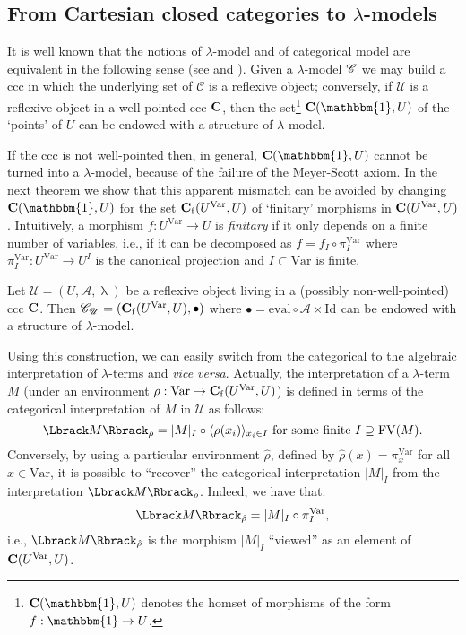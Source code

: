 \documentclass[english]{llncs}
\renewcommand{\bold}[1]{{\bf #1}}
\newcommand{\Var}{\mathrm{Var}}
\newcommand{\FV}{\mathrm{FV}}
\newcommand{\Id}[1]{\mathrm{Id}_{#1}}
\newcommand{\cat}[1]{\bold{#1}}
\newcommand{\Termobj}{\mathbbm{1}}
\newcommand{\eval}{\mathrm{eval}}
\newcommand{\proj}[1]{\pi_{#1}}
\newcommand{\Fmor}[2]{\cat{#1}_\mathrm{f}(#2^\Var,#2)}
\newcommand{\ro}[1]{\mathscr{#1}} \newcommand{\App}{\mathcal{A}}
\newcommand{\Abs}{\uplambda}
\newcommand{\Cint}[1]{\vert {#1}\vert}
\newcommand{\alg}[1]{\mathscr{#1}} \newcommand{\CE}[1]{{\mathrm{CE}(#1)}} \newcommand{\IE}[1]{{\mathrm{IE}(#1)}} \newcommand{\class}[1]{\mathbb{#1}}
\newcommand{\comp}{\circ}
\newcommand{\gl}{\lambda}
\begin{document}
\subsection{From Cartesian closed categories to $\lambda$-models}

It is well known that the notions of $\lambda$-model and of categorical model are equivalent in the following sense (see \cite[Ch.~5]{Bare} and \cite[Sec.~9.5]{AspertiL91}).
Given a $\lambda$-model $\mathscr{C}$ we may build a ccc in which the underlying set of $\alg{C}$ is a reflexive object; 
conversely, if $\ro{U}$ is a reflexive object in a well-pointed ccc $\cat{C}$, then the set\footnote{
$\cat{C}(\Termobj,U)$ denotes the homset of morphisms of the form $f:\Termobj\to U$.
} $\cat{C}(\Termobj,U)$ of the `points' of $U$ 
can be endowed with a structure of $\lambda$-model.

If the ccc is not well-pointed then, in general, $\cat{C}(\Termobj,U)$ cannot be turned into a $\lambda$-model, because of the failure of the Meyer-Scott axiom.
In the next theorem we show that this apparent mismatch can be avoided by changing $\cat{C}(\Termobj,U)$
for the set $\Fmor{C}{U}$ of `finitary' morphisms in $\cat{C}(U^\Var,U)$. 
Intuitively, a morphism $f:U^\Var\to U$ is {\em finitary} if it only depends on a finite number of variables, i.e., if it can be decomposed as $f = f_I\comp \proj{I}^\Var$
where $\proj{I}^\Var:U^\Var\to U^I$ is the canonical projection and $I\subset\Var$ is finite. 



\begin{theorem} \cite[Thm.~2.2.12]{ManzonettoTh} Let $\ro{U} = (U,\App,\Abs)$ be a reflexive object living in a (possibly non-well-pointed) ccc $\cat{C}$. 
Then $\alg{C}_{\ro{U}} = (\Fmor{C}{U}, \bullet)$ where $\bullet = \eval\comp\App\times\Id{}$ can be endowed with a structure of $\gl$-model.
\end{theorem}

Using this construction, we can easily switch from the categorical to the algebraic interpretation of $\lambda$-terms and {\em vice versa}.
Actually, the interpretation of a $\gl$-term $M$ (under an environment $\rho:\Var\to\Fmor{C}{U}$) is defined in terms of the categorical interpretation 
of $M$ in $\ro{U}$ as follows:
$$
\Lint{M}_\rho = \Cint{M}_I \comp \langle\rho(x_i)\rangle_{x_i\in I} \textrm{ for some finite $I\supseteq\FV(M)$.}
$$
Conversely, by using a particular environment $\hat{\rho}$, defined by $\hat{\rho}(x) = \proj{x}^\Var$ for all $x\in\Var$,
it is possible to ``recover'' the categorical interpretation 
$\Cint{M}_I$ from the interpretation $\Lint{M}_\rho$. Indeed, we have that:
$$
    \Lint{M}_{\hat\rho}=\Cint{M}_I\comp \pi_I^\Var,
$$
i.e., $\Lint{M}_{\hat\rho}$ is the morphism $\Cint{M}_I$ ``viewed'' as an element of $\cat{C}(U^{\Var},U)$.
\end{document}
